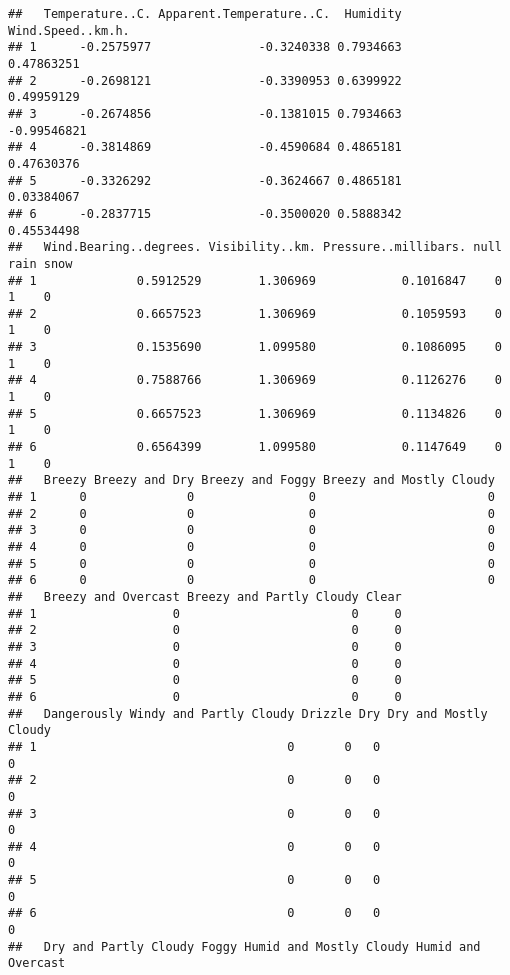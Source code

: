 \documentclass[
]{article}
\begin{document}
\begin{verbatim}
##   Temperature..C. Apparent.Temperature..C.  Humidity Wind.Speed..km.h.
## 1      -0.2575977               -0.3240338 0.7934663        0.47863251
## 2      -0.2698121               -0.3390953 0.6399922        0.49959129
## 3      -0.2674856               -0.1381015 0.7934663       -0.99546821
## 4      -0.3814869               -0.4590684 0.4865181        0.47630376
## 5      -0.3326292               -0.3624667 0.4865181        0.03384067
## 6      -0.2837715               -0.3500020 0.5888342        0.45534498
##   Wind.Bearing..degrees. Visibility..km. Pressure..millibars. null rain snow
## 1              0.5912529        1.306969            0.1016847    0    1    0
## 2              0.6657523        1.306969            0.1059593    0    1    0
## 3              0.1535690        1.099580            0.1086095    0    1    0
## 4              0.7588766        1.306969            0.1126276    0    1    0
## 5              0.6657523        1.306969            0.1134826    0    1    0
## 6              0.6564399        1.099580            0.1147649    0    1    0
##   Breezy Breezy and Dry Breezy and Foggy Breezy and Mostly Cloudy
## 1      0              0                0                        0
## 2      0              0                0                        0
## 3      0              0                0                        0
## 4      0              0                0                        0
## 5      0              0                0                        0
## 6      0              0                0                        0
##   Breezy and Overcast Breezy and Partly Cloudy Clear
## 1                   0                        0     0
## 2                   0                        0     0
## 3                   0                        0     0
## 4                   0                        0     0
## 5                   0                        0     0
## 6                   0                        0     0
##   Dangerously Windy and Partly Cloudy Drizzle Dry Dry and Mostly Cloudy
## 1                                   0       0   0                     0
## 2                                   0       0   0                     0
## 3                                   0       0   0                     0
## 4                                   0       0   0                     0
## 5                                   0       0   0                     0
## 6                                   0       0   0                     0
##   Dry and Partly Cloudy Foggy Humid and Mostly Cloudy Humid and Overcast

\end{verbatim}
\end{document}
